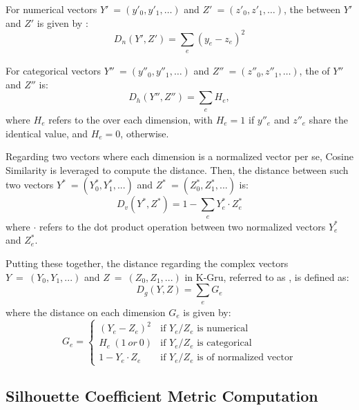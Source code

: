 For numerical vectors $Y'\ = (y'_0, y'_1, \ldots)$ and $Z'\ = (z'_0, z'_1, \ldots)$, the \od{} \cite{IEEEexample:books/mk/HanKP2011} between $Y'$ and $Z'$ is given by :
%
\begin{equation}
\label{eq:od}
D_n(Y', Z') = \sum_{\substack{e}} (y_e - z_e)^2
\end{equation}

For categorical vectors $Y''\ = (y''_0, y''_1, \ldots)$ and  $Z''\ = (z''_0, z''_1, \ldots)$, the \hd{} \cite{IEEEexample:huang1997clustering} of $Y''$ and $Z''$ is:
%
\begin{equation}
\label{eq:hd}
D_h(Y'', Z'') = \sum_{\substack{e}} H_e,
\end{equation}
where $H_e$ refers to the \hd{} over each dimension, with $H_e = 1$ if $y''_e$ and $z''_e$ share the identical value, and $H_e = 0$, otherwise.

Regarding two vectors where each dimension is a normalized vector per se, Cosine Similarity is leveraged to compute the distance.
Then, the distance between such two vectors $Y^{\ast}\ = (Y^{\ast}_0, Y^{\ast}_1, ...)$ and $Z^{\ast}\ = (Z^{\ast}_0, Z^{\ast}_1, ...)$ is:
%
\begin{equation}
\label{eq:vd}
D_v(Y^{\ast}, Z^{\ast}) = 1- \sum_{\substack{e}} Y^{\ast}_e \cdot Z^{\ast}_e
\end{equation}
where $\cdot$ refers to the dot product operation between two normalized vectors $Y^{\ast}_e$ and $Z^{\ast}_e$.

Putting these together, the distance regarding the complex vectors $Y\ =\ (Y_0, Y_1, ...)$ and $Z\ =\ (Z_0, Z_1, ...)$ in K-Gru, referred to as \gd{}, is defined as:
%
\begin{equation}
\label{eq:gd}
D_g(Y, Z) = \sum_{\substack{e}} G_e
\end{equation}
where the distance on each dimension $G_e$ is given by:
%
\begin{equation}
\label{eq:ge}
G_e =
  \begin{cases}
    (Y_e - Z_e)^2       &  \text{if } Y_e/Z_e \text{ is numerical}\\
    H_e\ (1\ or\ 0)       	&  \text{if } Y_e/Z_e \text{ is categorical}\\
    1 - Y_e \cdot Z_e  		&  \text{if } Y_e/Z_e \text{ is of normalized vector}
  \end{cases}
\end{equation}


\subsection{Silhouette Coefficient Metric Computation}
\label{sec:compu}

